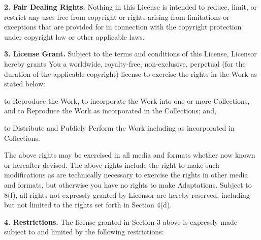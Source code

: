 \par \textbf{2. Fair Dealing Rights.} Nothing in this
License is intended to reduce, limit, or restrict any uses
free from copyright or rights arising from limitations or
exceptions that are provided for in connection with the
copyright protection under copyright law or other
applicable laws.
\par \textbf{3. License Grant.} Subject to the terms
and conditions of this License, Licensor hereby grants You
a worldwide, royalty-free, non-exclusive, perpetual (for
the duration of the applicable copyright) license to
exercise the rights in the Work as stated below:
\begin{doclicense@enumerate}
\item to Reproduce the Work, to incorporate the Work into
one or more Collections, and to Reproduce the Work as
incorporated in the Collections; and,
\item to Distribute and Publicly Perform the Work including
as incorporated in Collections.
\end{doclicense@enumerate}
\par The above rights may be exercised in all media and
formats whether now known or hereafter devised. The above
rights include the right to make such modifications as are
technically necessary to exercise the rights in other media
and formats, but otherwise you have no rights to make
Adaptations. Subject to 8(f), all rights not expressly
granted by Licensor are hereby reserved, including but not
limited to the rights set forth in Section 4(d).
\par \textbf{4. Restrictions.} The license granted in
Section 3 above is expressly made subject to and limited by
the following restrictions:
